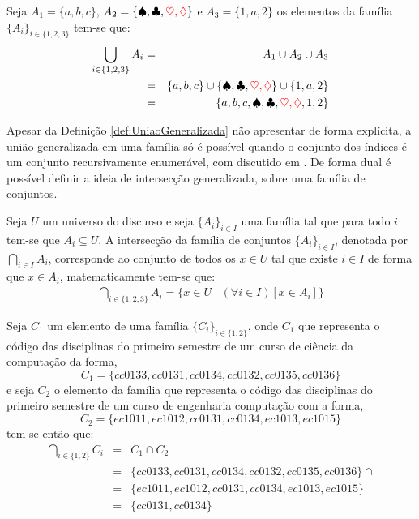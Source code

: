 \begin{exemplo}\label{exe:UniaoGeneralizada1}
	Seja $A_1 = \{a, b, c\}$, $A_2 = \{\spadesuit, \clubsuit, {\color{red} \heartsuit, \lozenge}\}$ e $A_3 = \{1, a, 2\}$ os elementos da família $\{A_i\}_{i \in \{1, 2, 3\}}$ tem-se que:
	\begin{eqnarray*}
		\bigcup_{i \in \{1, 2, 3\}} A_i & = & A_1 \cup A_2 \cup A_3\\
		& = & \{a, b, c\} \cup \{\spadesuit, \clubsuit, {\color{red} \heartsuit, \lozenge}\} \cup \{1, a, 2\}\\
		& = & \{a, b, c, \spadesuit, \clubsuit, {\color{red} \heartsuit, \lozenge}, 1, 2\}
	\end{eqnarray*}
\end{exemplo}

Apesar da Definição \ref{def:UniaoGeneralizada} não apresentar de forma explícita, a união generalizada em uma família só é possível quando o conjunto dos índices é um conjunto recursivamente enumerável, com discutido em \cite{carmo2013}. De forma dual é possível definir a ideia de intersecção generalizada, sobre uma família de conjuntos.

\begin{definicao}\label{def:IntersecaoGeneralizada}
	Seja $U$ um universo do discurso e seja $\{{A_i}\}_{i \in I}$ uma família tal que para todo $i$ tem-se que $A_i \subseteq U$. A intersecção da família de conjuntos $\{{A_i}\}_{i \in I}$, denotada por $\bigcap_{i \in I} A_i$, corresponde ao conjunto de todos os $x \in U$ tal que existe $i \in I$ de forma que $x \in A_i$, matematicamente tem-se que:
	\begin{eqnarray*}
		\bigcap_{i \in \{1, 2, 3\}} A_i = \{x \in U \mid (\forall i \in I)[x \in A_i]\}
	\end{eqnarray*}
\end{definicao}

\begin{exemplo}\label{exe:IntersecaoGeneralizada1}
	Seja $C_1$ um elemento de uma família $\{C_i\}_{i \in \{1, 2\}}$, onde $C_1$ que representa o código das disciplinas do primeiro semestre de um curso de ciência da computação da forma,
	$$C_1 = \{cc0133, cc0131, cc0134, cc0132, cc0135, cc0136\}$$ 
	e seja $C_2$ o elemento da família que representa o código das disciplinas do primeiro semestre de um curso de engenharia computação com a forma,
	$$C_2 = \{ec1011, ec1012, cc0131, cc0134, ec1013, ec1015\}$$ 
	tem-se então que:
	\begin{eqnarray*}
		\bigcap_{i \in \{1, 2\}} C_i & = & C_1 \cap C_2\\
		& = & \{cc0133, cc0131, cc0134, cc0132, cc0135, cc0136\} \cap\\
		& = & \{ec1011, ec1012, cc0131, cc0134, ec1013, ec1015\}\\
		& = & \{cc0131, cc0134\}
	\end{eqnarray*}
\end{exemplo}





